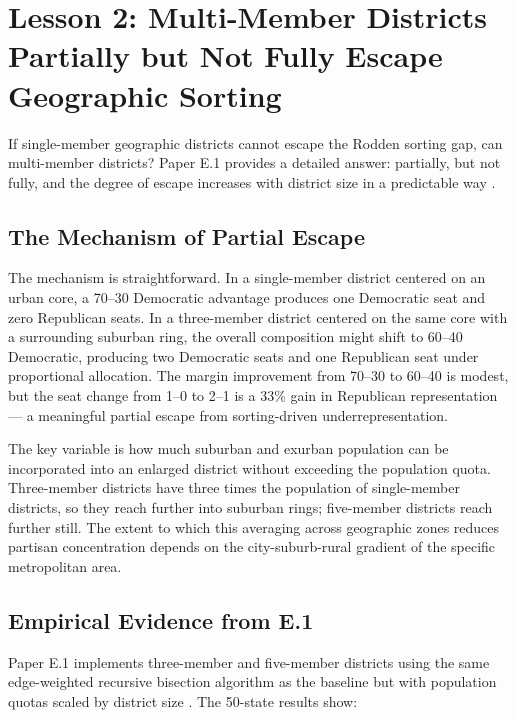 \section{Lesson 2: Multi-Member Districts Partially but Not Fully Escape Geographic Sorting}
\label{sec:lesson2}

If single-member geographic districts cannot escape the Rodden sorting gap,
can multi-member districts?  Paper E.1 provides a detailed answer: partially,
but not fully, and the degree of escape increases with district size in a
predictable way \citep{dellaLibera2026e1}.

\subsection{The Mechanism of Partial Escape}

The mechanism is straightforward.  In a single-member district centered on
an urban core, a 70--30 Democratic advantage produces one Democratic seat and
zero Republican seats.  In a three-member district centered on the same core
with a surrounding suburban ring, the overall composition might shift to 60--40
Democratic, producing two Democratic seats and one Republican seat under
proportional allocation.  The margin improvement from 70--30 to 60--40 is
modest, but the seat change from 1--0 to 2--1 is a 33\% gain in Republican
representation --- a meaningful partial escape from sorting-driven
underrepresentation.

The key variable is how much suburban and exurban population can be incorporated
into an enlarged district without exceeding the population quota.  Three-member
districts have three times the population of single-member districts, so they
reach further into suburban rings; five-member districts reach further still.
The extent to which this averaging across geographic zones reduces partisan
concentration depends on the city-suburb-rural gradient of the specific
metropolitan area.

\subsection{Empirical Evidence from E.1}

Paper E.1 implements three-member and five-member districts using the same
edge-weighted recursive bisection algorithm as the baseline but with population
quotas scaled by district size \citep{dellaLibera2026e1}.  The 50-state results
show:

